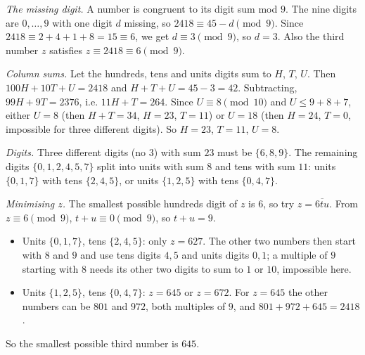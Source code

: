 \emph{The missing digit.} A number is congruent to its digit sum mod $9$. The nine digits are $0,\dots,9$ with one digit $d$ missing, so $2418\equiv45-d\pmod9$. Since $2418\equiv2+4+1+8=15\equiv6$, we get $d\equiv3\pmod9$, so $d=3$. Also the third number $z$ satisfies $z\equiv2418\equiv6\pmod9$.

\emph{Column sums.} Let the hundreds, tens and units digits sum to $H$, $T$, $U$. Then $100H+10T+U=2418$ and $H+T+U=45-3=42$. Subtracting, $99H+9T=2376$, i.e. $11H+T=264$. Since $U\equiv8\pmod{10}$ and $U\le9+8+7$, either $U=8$ (then $H+T=34$, $H=23$, $T=11$) or $U=18$ (then $H=24$, $T=0$, impossible for three different digits). So $H=23$, $T=11$, $U=8$.

\emph{Digits.} Three different digits (no $3$) with sum $23$ must be $\{6,8,9\}$. The remaining digits $\{0,1,2,4,5,7\}$ split into units with sum $8$ and tens with sum $11$: units $\{0,1,7\}$ with tens $\{2,4,5\}$, or units $\{1,2,5\}$ with tens $\{0,4,7\}$.

\emph{Minimising $z$.} The smallest possible hundreds digit of $z$ is $6$, so try $z=\overline{6tu}$. From $z\equiv6\pmod9$, $t+u\equiv0\pmod9$, so $t+u=9$.
\begin{itemize}
\item Units $\{0,1,7\}$, tens $\{2,4,5\}$: only $z=627$. The other two numbers then start with $8$ and $9$ and use tens digits $4,5$ and units digits $0,1$; a multiple of $9$ starting with $8$ needs its other two digits to sum to $1$ or $10$, impossible here.
\item Units $\{1,2,5\}$, tens $\{0,4,7\}$: $z=645$ or $z=672$. For $z=645$ the other numbers can be $801$ and $972$, both multiples of $9$, and $801+972+645=2418$.
\end{itemize}
So the smallest possible third number is $\boxed{645}$.
